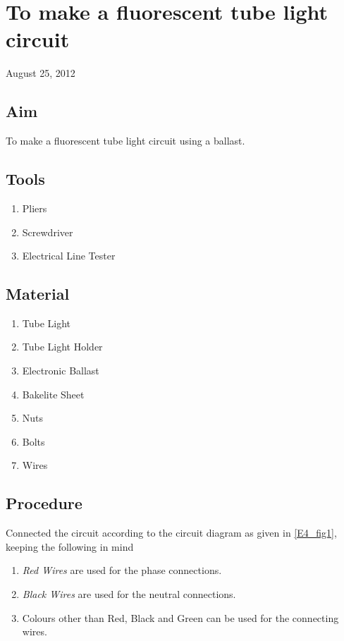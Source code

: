 \chapter{To make a fluorescent tube light circuit}
\begin{flushright}
August 25, 2012
\end{flushright}
\section{Aim}
To make a fluorescent tube light circuit using a ballast.

\section {Tools}
	\begin{enumerate}
		\item Pliers
		\item Screwdriver
		\item Electrical Line Tester
	\end{enumerate}
\section {Material}
	\begin{enumerate}
		\item Tube Light
		\item Tube Light Holder
		\item Electronic Ballast
		\item Bakelite Sheet
		\item Nuts
		\item Bolts
		\item Wires
	\end{enumerate}
\section{Procedure}
	Connected the circuit according to the circuit diagram as given in \autoref{E4_fig1}, keeping the following in mind
	\begin{enumerate}
		\item \emph{Red Wires} are used for the phase connections.
		\item \emph{Black Wires} are used for the neutral connections.
		\item Colours other than Red, Black and Green can be used for the connecting wires.
	\end{enumerate}	
	

